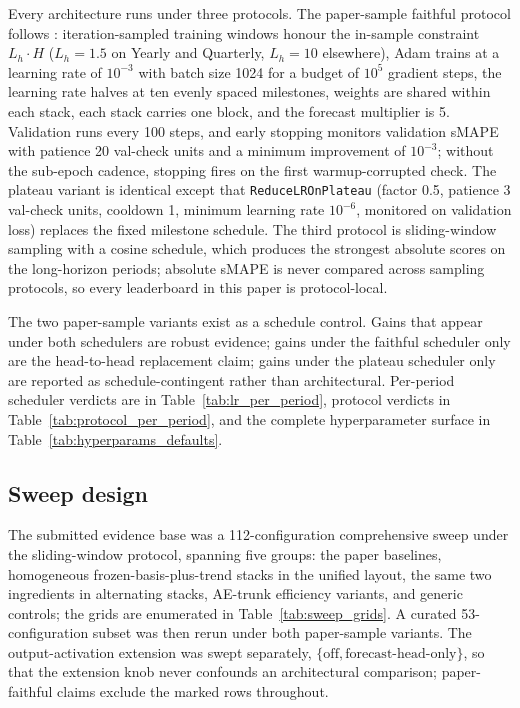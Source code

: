 Every architecture runs under three protocols. The paper-sample faithful
protocol follows \citet{oreshkin2020nbeats}: iteration-sampled training
windows honour the in-sample constraint $L_h \cdot H$ ($L_h = 1.5$ on
Yearly and Quarterly, $L_h = 10$ elsewhere), Adam trains at a learning
rate of $10^{-3}$ with batch size 1024 for a budget of $10^{5}$ gradient
steps, the learning rate halves at ten evenly spaced milestones, weights
are shared within each stack, each stack carries one block, and the
forecast multiplier is 5. Validation runs every 100 steps, and early
stopping monitors validation sMAPE with patience 20 val-check units and
a minimum improvement of $10^{-3}$; without the sub-epoch cadence,
stopping fires on the first warmup-corrupted check. The plateau variant
is identical except that \texttt{ReduceLROnPlateau} (factor 0.5,
patience 3 val-check units, cooldown 1, minimum learning rate
$10^{-6}$, monitored on validation loss) replaces the fixed milestone
schedule. The third protocol is sliding-window sampling with a cosine
schedule, which produces the strongest absolute scores on the
long-horizon periods; absolute sMAPE is never compared across sampling
protocols, so every leaderboard in this paper is protocol-local.

The two paper-sample variants exist as a schedule control. Gains that
appear under both schedulers are robust evidence; gains under the
faithful scheduler only are the head-to-head replacement claim; gains
under the plateau scheduler only are reported as schedule-contingent
rather than architectural. Per-period scheduler verdicts are in
Table~\ref{tab:lr_per_period}, protocol verdicts in
Table~\ref{tab:protocol_per_period}, and the complete hyperparameter
surface in Table~\ref{tab:hyperparams_defaults}.

\subsection{Sweep design}
\label{sec:setup:sweeps}

The submitted evidence base was a 112-configuration comprehensive sweep
under the sliding-window protocol, spanning five groups: the paper
baselines, homogeneous frozen-basis-plus-trend stacks in the unified
layout, the same two ingredients in alternating stacks, AE-trunk
efficiency variants, and generic controls; the grids are enumerated in
Table~\ref{tab:sweep_grids}. A curated 53-configuration subset was then
rerun under both paper-sample variants. The output-activation extension
was swept separately, $\{\text{off}, \text{forecast-head-only}\}$, so
that the extension knob never confounds an architectural comparison;
paper-faithful claims exclude the marked rows throughout.

